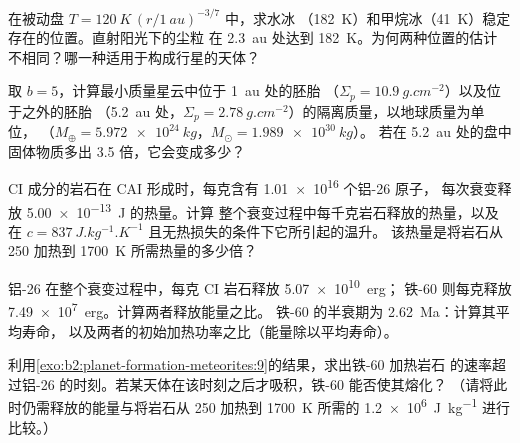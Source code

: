 \begin{exercise}[$\star\star$]\label{exo:b2:planet-formation-meteorites:6}
在被动盘 $T = \qty{120}{K}\,(r/\qty{1}{au})^{-3/7}$ 中，求水冰
（\qty{182}{K}）和甲烷冰（\qty{41}{K}）稳定存在的位置。直射阳光下的尘粒
在 \qty{2.3}{au} 处达到 \qty{182}{K}。为何两种位置的估计
不相同？哪一种适用于构成行星的天体？
\end{exercise}

\begin{exercise}[$\star\star$]\label{exo:b2:planet-formation-meteorites:7}
取 $b = 5$，计算最小质量星云中位于 \qty{1}{au} 处的胚胎
（$\Sigma_p = \qty{10.9}{g.cm^{-2}}$）以及位于之外的胚胎
（\qty{5.2}{au} 处，$\Sigma_p = \qty{2.78}{g.cm^{-2}}$）的隔离质量，以地球质量为单位，
（$M_\oplus = \qty{5.972e24}{kg}$，$M_\odot = \qty{1.989e30}{kg}$）。
若在 \qty{5.2}{au} 处的盘中固体物质多出 \num{3.5} 倍，它会变成多少？
\end{exercise}

\begin{exercise}[$\star\star$]\label{exo:b2:planet-formation-meteorites:8}
CI 成分的岩石在 CAI 形成时，每克含有 \num{1.01e16} 个铝-26 原子，
每次衰变释放 \qty{5.00e-13}{J} 的热量。计算
整个衰变过程中每千克岩石释放的热量，以及
在 $c = \qty{837}{J.kg^{-1}.K^{-1}}$ 且无热损失的条件下它所引起的温升。
该热量是将岩石从 \num{250} 加热到
\qty{1700}{K} 所需热量的多少倍？
\end{exercise}

\begin{exercise}[$\star\star$]\label{exo:b2:planet-formation-meteorites:9}
铝-26 在整个衰变过程中，每克 CI 岩石释放 \qty{5.07e10}{erg}；
铁-60 则每克释放 \qty{7.49e7}{erg}。计算两者释放能量之比。
铁-60 的半衰期为 \qty{2.62}{Ma}：计算其平均寿命，
以及两者的初始加热功率之比（能量除以平均寿命）。
\end{exercise}

\begin{exercise}[$\star\star\star$]\label{exo:b2:planet-formation-meteorites:10}
利用\cref{exo:b2:planet-formation-meteorites:9}的结果，求出铁-60 加热岩石
的速率超过铝-26 的时刻。若某天体在该时刻之后才吸积，铁-60 能否使其熔化？
（请将此时仍需释放的能量与将岩石从 \num{250} 加热到 \qty{1700}{K}
所需的 \qty{1.2e6}{J.kg^{-1}} 进行比较。）
\end{exercise}

